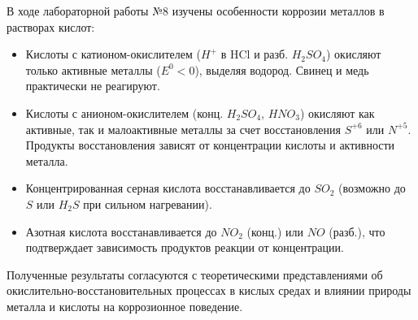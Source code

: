 \documentclass[a4paper,12pt]{article}
\begin{document}
	\quad В ходе лабораторной работы №8 изучены особенности коррозии металлов в растворах кислот:
	\begin{itemize}
		\item Кислоты с катионом-окислителем (\(H^+\) в HCl и разб. \(H_2SO_4\)) окисляют только активные металлы (\(E^0 < 0\)), выделяя водород. Свинец и медь практически не реагируют.
		\item Кислоты с анионом-окислителем (конц. \(H_2SO_4\), \(HNO_3\)) окисляют как активные, так и малоактивные металлы за счет восстановления \(S^{+6}\) или \(N^{+5}\). Продукты восстановления зависят от концентрации кислоты и активности металла.
		\item Концентрированная серная кислота восстанавливается до \(SO_2\) (возможно до \(S\) или \(H_2S\) при сильном нагревании).
		\item Азотная кислота восстанавливается до \(NO_2\) (конц.) или \(NO\) (разб.), что подтверждает зависимость продуктов реакции от концентрации.
	\end{itemize}
	
	\quad Полученные результаты согласуются с теоретическими представлениями об окислительно-восстановительных процессах в кислых средах и влиянии природы металла и кислоты на коррозионное поведение.
	
\end{document}
